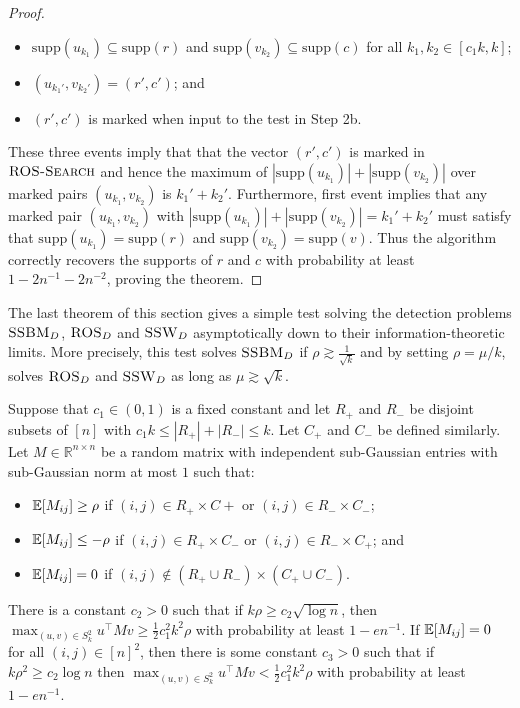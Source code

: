 \begin{proof}
\begin{itemize}
\item $\text{supp}(u_{k_1}) \subseteq \text{supp}(r)$ and $\text{supp}(v_{k_2}) \subseteq \text{supp}(c)$ for all $k_1, k_2 \in [c_1 k, k]$;
\item $(u_{k_1'}, v_{k_2'}) = (r', c')$; and
\item $(r', c')$ is marked when input to the test in Step 2b.
\end{itemize}
These three events imply that that the vector $(r', c')$ is marked in $\textsc{ROS-Search}$ and hence the maximum of $|\text{supp}(u_{k_1})| + |\text{supp}(v_{k_2})|$ over marked pairs $(u_{k_1}, v_{k_2})$ is $k_1' + k_2'$. Furthermore, first event implies that any marked pair $(u_{k_1}, v_{k_2})$ with $|\text{supp}(u_{k_1})| + |\text{supp}(v_{k_2})| = k_1' + k_2'$ must satisfy that $\text{supp}(u_{k_1}) = \text{supp}(r)$ and $\text{supp}(v_{k_2}) = \text{supp}(v)$. Thus the algorithm correctly recovers the supports of $r$ and $c$ with probability at least $1 - 2n^{-1} - 2n^{-2}$, proving the theorem.
\end{proof}

The last theorem of this section gives a simple test solving the detection problems $\textsc{SSBM}_D$, $\textsc{ROS}_D$ and $\textsc{SSW}_D$ asymptotically down to their information-theoretic limits. More precisely, this test solves $\textsc{SSBM}_D$ if $\rho \gtrsim \frac{1}{\sqrt{k}}$ and by setting $\rho = \mu/k$, solves $\textsc{ROS}_D$ and $\textsc{SSW}_D$ as long as $\mu \gtrsim \sqrt{k}$.

\begin{theorem}
Suppose that $c_1 \in (0, 1)$ is a fixed constant and let $R_+$ and $R_-$ be disjoint subsets of $[n]$ with $c_1 k \le |R_+| + |R_-| \le k$. Let $C_+$ and $C_-$ be defined similarly. Let $M \in \mathbb{R}^{n \times n}$ be a random matrix with independent sub-Gaussian entries with sub-Gaussian norm at most $1$ such that:
\begin{itemize}
\item $\mathbb{E}[M_{ij}] \ge \rho$ if $(i, j) \in R_+ \times C+$ or $(i, j) \in R_- \times C_-$;
\item $\mathbb{E}[M_{ij}] \le -\rho$ if $(i, j) \in R_+ \times C_-$ or $(i, j) \in R_- \times C_+$; and
\item $\mathbb{E}[M_{ij}] = 0$ if $(i, j) \not \in (R_+ \cup R_-) \times (C_+ \cup C_-)$.
\end{itemize}
There is a constant $c_2 > 0$ such that if $k \rho \ge c_2 \sqrt{\log n}$, then $\max_{(u, v) \in S_k^2} u^\top M v \ge \frac{1}{2} c_1^2 k^2 \rho$ with probability at least $1 - en^{-1}$. If $\mathbb{E}[M_{ij}] = 0$ for all $(i, j) \in [n]^2$, then there is some constant $c_3 > 0$ such that if $k \rho^2 \ge c_2 \log n$ then $\max_{(u, v) \in S_k^2} u^\top M v < \frac{1}{2} c_1^2 k^2 \rho$ with probability at least $1 - en^{-1}$.
\end{theorem}

